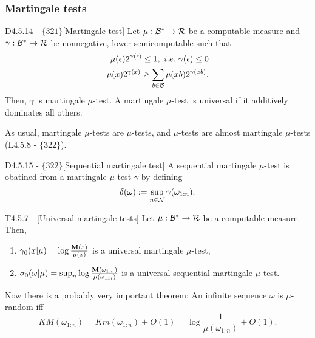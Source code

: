 \documentclass{article}
\begin{document}
\subsubsection{Martingale tests}

\begin{flexidefinition}{D4.5.14 - $\{321\}$}[Martingale test]
    Let $\mu : \mathcal{B}^\ast \to \mathcal{R}$ be a computable measure and $\gamma : \mathcal{B}^\ast \to \mathcal{R}$ be nonnegative, lower semicomputable such that
    \begin{align}
        \mu(\epsilon)2^{\gamma(\epsilon)} \leq 1, \ i.e. \ \gamma(\epsilon) \leq 0\\
        \mu(x)2^{\gamma(x)} \geq \sum_{b \in \BB} \mu(xb) 2^{\gamma(xb)}.
    \end{align}
Then, $\gamma$ is martingale $\mu$-test. A martingale $\mu$-test is universal if it additively dominates all others.
\end{flexidefinition}

As usual, martingale $\mu$-tests are $\mu$-tests, and $\mu$-tests are almost martingale $\mu$-tests (L4.5.8 - $\{322\}$).

\begin{flexidefinition}{D4.5.15 - $\{322\}$}[Sequential martingale test]
    A sequential martingale $\mu$-test is obatined from a martingale $\mu$-test $\gamma$ by defining
    \begin{equation}
        \delta(\omega) := \sup_{n \in \mathcal{N}} \gamma(\omega_{1:n}).
    \end{equation}
\end{flexidefinition}
\begin{flexitheorem}{T4.5.7 - }[Universal martingale tests]
    Let $\mu : \mathcal{B}^\ast \to \mathcal{R}$ be a computable measure. Then,
    \begin{enumerate}[label = (\roman*)]
        \item $\gamma_0(x|\mu) = \log \frac{{\bf M}(x)}{\mu(x)}$ is a universal martingale $\mu$-test,
        \item $\sigma_0(\omega|\mu) = \sup_{n} \log \frac{{\bf M}(\omega_{1:n})}{\mu(\omega_{1:n})}$ is a universal sequential martingale $\mu$-test.
    \end{enumerate}
\end{flexitheorem}
 Now there is a probably very important theorem:
An infinite sequence $\omega$ is $\mu$-random iff
\begin{equation}
    KM(\omega_{1:n}) = Km(\omega_{1:n}) + O(1) = \log \frac{1}{\mu(\omega_{1:n})} + O(1).
\end{equation}
\end{document}
